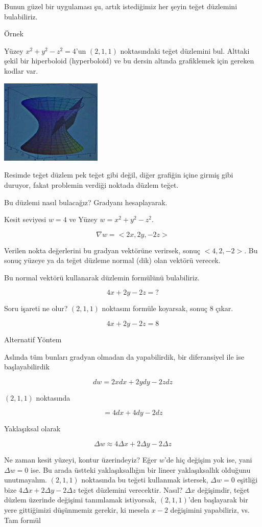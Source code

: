 \documentclass[12pt,fleqn]{article}\usepackage{../../common}
\begin{document}
Bunun güzel bir uygulaması şu, artık istediğimiz her şeyin teğet düzlemini
bulabiliriz. 

Örnek

Yüzey $x^2 + y^2 - z^2 = 4$'un $(2,1,1)$ noktasındaki teğet düzlemini
bul. Alttaki şekil bir hiperboloid (hyperboloid) ve bu dersin altında
grafiklemek için gereken kodlar var.

\includegraphics[height=4cm]{12_5.jpg}

Resimde teğet düzlem pek teğet gibi değil, diğer grafiğin içine girmiş gibi
duruyor, fakat problemin verdiği noktada düzlem teğet. 

Bu düzlemi nasıl bulacağız? Gradyanı hesaplayarak. 

Kesit seviyesi $w=4$ ve Yüzey $w = x^2 + y^2 - z^2$. 

$$ \nabla w = <2x, 2y, -2z> $$

Verilen nokta değerlerini bu gradyan vektörüne verirsek, sonuç
$< 4,2,-2 >$. Bu sonuç yüzeye ya da teğet düzleme normal (dik) olan 
vektörü verecek. 

Bu normal vektörü kullanarak düzlemin formülünü bulabiliriz. 

$$ 4x + 2y - 2z = ? $$

Soru işareti ne olur? $(2,1,1)$ noktasını formüle koyarsak, sonuç 8 çıkar.

$$ 4x + 2y - 2z = 8 $$

Alternatif Yöntem

Aslında tüm bunları gradyan olmadan da yapabilirdik, bir diferansiyel ile
ise başlayabilirdik

$$ dw = 2x dx + 2y dy -2z dz $$

$(2,1,1)$ noktasında

$$ = 4dx + 4dy - 2dz $$

Yaklaşıksal olarak 

$$ \Delta w \approx 4 \Delta x + 2\Delta y - 2\Delta z  $$

Ne zaman kesit yüzeyi, kontur üzerindeyiz? Eğer $w$'de hiç değişim yok ise, yani
$\Delta w = 0$ ise. Bu arada üstteki yaklaşıksallığın bir lineer yaklaşıksallık
olduğunu unutmayalım. $(2,1,1)$ noktasında bu teğeti kullanmak istersek, $\Delta
w = 0$ eşitliği bize $4 \Delta x + 2\Delta y - 2\Delta z $ teğet düzlemini
verecektir. Nasıl? $\Delta x$ değişimdir, teğet düzlem üzerinde değişimi
tanımlamak istiyorsak, $(2,1,1)$'den başlayarak bir yere gittiğimizi düşünmemiz
gerekir, ki mesela $x-2$ değişimini yapabiliriz, vs. Tam formül
\end{document}
